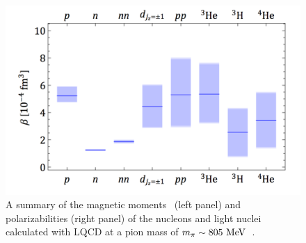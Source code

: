 %
\begin{figure}[!t]
	\centering
	\includegraphics[width=0.49\columnwidth]{figures/PhysPols.pdf}
	\caption{ 
		A summary of the magnetic moments~\protect\cite{Beane:2014ora} (left panel) and polarizabilities (right panel) of the nucleons and
		light nuclei calculated with LQCD at a pion mass of
		$m_\pi\sim 805~{\rm MeV}$~\protect\cite{Chang:2015qxa}.    }
	\label{fig:summaryBETA}
\end{figure}

